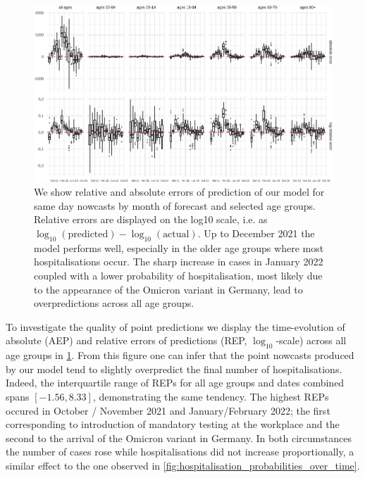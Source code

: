 \begin{figure}

    {\centering \includegraphics[width=\textwidth]{figures_tentative/REP-1.pdf} 

}

\caption{
We show relative and absolute errors of prediction of our model for same day nowcasts by month of forecast and selected age groups. 
Relative errors are displayed on the log10 scale, i.e. as $\log_{10} (\text{predicted}) - \log_{10} (\text{actual})$.
Up to December 2021 the model performs well, especially in the older age groups where most hospitalisations occur. 
The sharp increase in cases in January 2022 coupled with a lower probability of hospitalisation, most likely due to the appearance of the Omicron variant in Germany, lead to overpredictions across all age groups.
}\label{fig:REP}
\end{figure}

To investigate the quality of point predictions we display the
time-evolution of absolute (AEP) and relative errors of predictions
(REP, \(\log_{10}\)-scale) across all age groups in 
\cref{fig:REP}. From this figure one can infer that the point nowcasts
produced by our model tend to slightly overpredict the final number of
hospitalisations. Indeed, the interquartile range of REPs for all age
groups and dates combined spans \([-1.56, 8.33]\), demonstrating the
same tendency. The highest REPs occured in October / November 2021 and
January/February 2022; the first corresponding to introduction of
mandatory testing at the workplace and the second to the arrival of the
Omicron variant in Germany. In both circumstances the number of cases
rose while hospitalisations did not increase proportionally, a similar
effect to the one observed in 
\cref{fig:hospitalisation_probabilities_over_time}.

